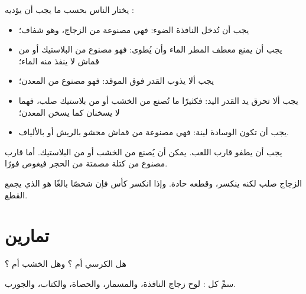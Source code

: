 \begin{proposition}\label{prop:g1:materials-around-us:choose}
يختار الناس   بحسب ما يجب أن يؤديه :
\begin{itemize}
  \item يجب أن تُدخل النافذة الضوء: فهي مصنوعة من الزجاج، وهو
        شفاف؛
  \item يجب أن يمنع معطف المطر الماء وأن يُطوى: فهو مصنوع من
        البلاستيك أو من قماش لا ينفذ منه الماء؛
  \item يجب ألا يذوب القدر فوق الموقد: فهو مصنوع من المعدن؛
  \item يجب ألا تحرق يد القدر اليد: فكثيرًا ما تُصنع من الخشب
        أو من بلاستيك صلب، فهما لا يسخنان كما يسخن المعدن؛
  \item يجب أن تكون الوسادة لينة: فهي مصنوعة من قماش محشو بالريش
        أو بالألياف.
\end{itemize}
\end{proposition}

\begin{example}[القارب]\label{ex:g1:materials-around-us:boat}
يجب أن يطفو قارب اللعب. يمكن أن يُصنع من الخشب أو من البلاستيك. أما
قارب مصنوع من كتلة مصمتة من الحجر فيغوص فورًا.
\end{example}

\begin{remark}\label{rem:g1:materials-around-us:glass}
الزجاج صلب لكنه ينكسر، وقطعه حادة. وإذا انكسر كأس فإن شخصًا بالغًا
هو الذي يجمع القطع.
\end{remark}

\section{تمارين}

\begin{exercise}[$\star$]\label{exo:g1:materials-around-us:1}
هل الكرسي  أم ؟ وهل الخشب  أم ؟
\end{exercise}

\begin{exercise}[$\star$]\label{exo:g1:materials-around-us:2}
سمِّ  كل : لوح زجاج النافذة، والمسمار، والحصاة، والكتاب،
والجورب.
\end{exercise}

